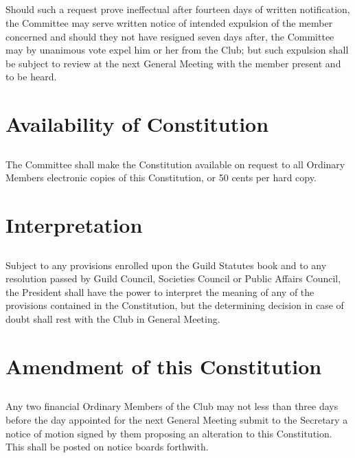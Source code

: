 \documentclass[10.5pt]{article}
\begin{document}
\subsection{} Should such a request prove ineffectual after fourteen days of written notification, the Committee may serve written notice of intended expulsion of the member concerned and should they not have resigned seven days after, the Committee may by unanimous vote expel him or her from the Club; but such expulsion shall be subject to review at the next General Meeting with the member present and to be heard. 
\newline


\section{Availability of Constitution}
\subsection{} The Committee shall make the Constitution available on request to all Ordinary Members electronic copies of this Constitution, or 50 cents per hard copy. 
\newline


\section{Interpretation}
\subsection{} Subject to any provisions enrolled upon the Guild Statutes book and to any resolution passed by Guild Council, Societies Council or Public Affairs Council, the President shall have the power to interpret the meaning of any of the provisions contained in the Constitution, but the determining decision in case of doubt shall rest with the Club in General Meeting. 
\newline


\section{Amendment of this Constitution}
\subsection{} Any two financial Ordinary Members of the Club may not less than three days before the day appointed for the next General Meeting submit to the Secretary a notice of motion signed by them proposing an alteration to this Constitution. This shall be posted on notice boards forthwith. 
\end{document}
